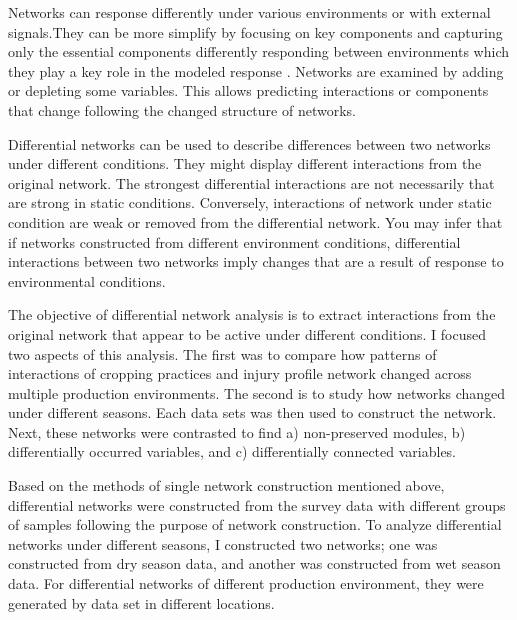 Networks can response differently under various environments or with external signals.They can be more simplify by focusing on key components and capturing only the essential components differently responding between environments which they play a key role in the modeled response . Networks are examined by adding or depleting some variables. This allows predicting interactions or components that change following the changed structure of networks. 

Differential networks can be used to describe differences between two networks under different conditions. They might display different interactions from the original network. The strongest differential interactions are not necessarily that are strong in static conditions. Conversely, interactions of network under static condition are weak or removed from the differential network. You may infer that if networks constructed from different environment conditions, differential interactions between two networks imply changes that are a result of response to environmental conditions. 

The objective of differential network analysis is to extract interactions from the original network that appear to be active under different conditions. I focused two aspects of this analysis. The first was to compare how patterns of interactions of cropping practices and injury profile network changed across multiple production environments. The second is to study how networks changed under different seasons. Each data sets was then used to construct the network. Next, these networks were contrasted to find a) non-preserved modules, b) differentially occurred variables, and c) differentially connected variables.

Based on the methods of single network construction mentioned above, differential networks were constructed from the survey data with different groups of samples following the purpose of network construction. To analyze differential networks under different seasons, I constructed two networks; one was constructed from dry season data, and another was constructed from wet season data. For differential networks of different production environment, they were generated by data set in different locations.

